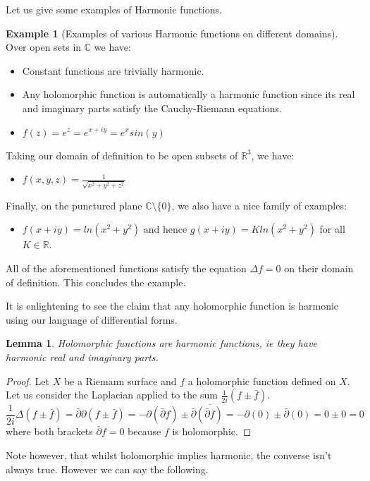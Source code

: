 \documentclass[a4paper,12pt]{report}
\theoremstyle{plain}
\newtheorem{lemma}[thm]{Lemma}
\theoremstyle{definition}
\newtheorem{example}[thm]{Example}
\begin{document}
Let us give some examples of Harmonic functions.
\newpage

\begin{example}[Examples of various Harmonic functions on different domains]
  Over open sets in $\mathbb{C}$ we have:
  \begin{itemize} 
    \item Constant functions are trivially harmonic.
    \item Any holomorphic function is automatically a harmonic function since its real and imaginary parts satisfy the Cauchy-Riemann equations.
    \item $f(z)=e^z=e^{x+iy}=e^xsin(y)$
  \end{itemize}
  Taking our domain of definition to be open subsets of $\mathbb{R}^3$, we have:
  \begin{itemize} 
    \item $f(x,y,z)=\frac{1}{\sqrt{x^2+y^2+z^2}}$
  \end{itemize}
  Finally, on the punctured plane $\mathbb{C}\setminus \{0\}$, we also have a nice family of examples:
  \begin{itemize}
    \item $f(x+iy) = ln(x^2 + y^2)$ and hence $g(x+iy)=K ln(x^2+y^2)$ for all $K \in \mathbb{R}$.
  \end{itemize}
  All of the aforementioned functions satisfy the equation $\Delta f = 0$ on their domain of definition. This concludes the example.
\end{example}

It is enlightening to see the claim that any holomorphic function is harmonic using our language of differential forms.
\begin{lemma}\label{HolIsHarm}
  Holomorphic functions are harmonic functions, ie they have harmonic real and imaginary parts. 
\end{lemma} 
\begin{proof}
  Let $X$ be a Riemann surface and $f$ a holomorphic function defined on $X$.
  Let us consider the Laplacian applied to the sum $\frac{1}{2i}(f \pm \bar{f})$.
  \[\frac{1}{2i}\Delta(f \pm \bar{f}) = \bar{\partial}\partial(f \pm \bar{f})=-\partial(\bar{\partial}f) \pm \bar{\partial}\overline{(\bar{\partial}f)}=-\partial(0) \pm \bar{\partial}(0) = 0 \pm 0 = 0\]
  where both brackets $\bar{\partial} f = 0$ because $f$ is holomorphic.
\end{proof}

Note however, that whilst holomorphic implies harmonic, the converse isn't always true. However we can say the following.
\end{document}
